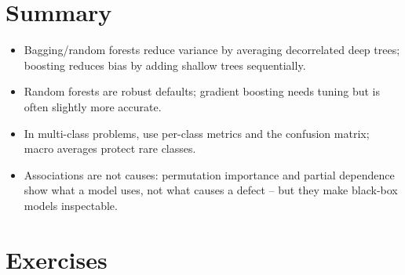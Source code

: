 \documentclass[
  letterpaper,
  DIV=11,
  numbers=noendperiod]{scrreprt}
\providecommand{\tightlist}{%
  \setlength{\itemsep}{0pt}\setlength{\parskip}{0pt}}\usepackage{longtable,booktabs,array}
\begin{document}
\section{Summary}\label{summary-8}

\begin{tcolorbox}[enhanced jigsaw, left=2mm, title=\textcolor{quarto-callout-important-color}{\faExclamation}\hspace{0.5em}{Key takeaways}, opacityback=0, breakable, rightrule=.15mm, arc=.35mm, toptitle=1mm, colbacktitle=quarto-callout-important-color!10!white, opacitybacktitle=0.6, coltitle=black, colframe=quarto-callout-important-color-frame, bottomrule=.15mm, leftrule=.75mm, bottomtitle=1mm, titlerule=0mm, toprule=.15mm, colback=white]

\begin{itemize}
\tightlist
\item
  Bagging/random forests reduce variance by averaging decorrelated deep
  trees; boosting reduces bias by adding shallow trees sequentially.
\item
  Random forests are robust defaults; gradient boosting needs tuning but
  is often slightly more accurate.
\item
  In multi-class problems, use per-class metrics and the confusion
  matrix; macro averages protect rare classes.
\item
  Associations are not causes: permutation importance and partial
  dependence show what a model uses, not what causes a defect -- but
  they make black-box models inspectable.
\end{itemize}

\end{tcolorbox}

\section{Exercises}\label{exercises-8}
\end{document}
